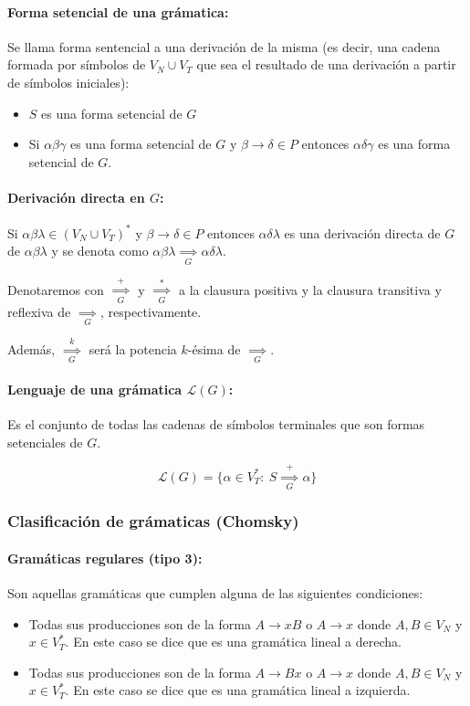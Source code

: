 \paragraph{Forma setencial de una grámatica:} Se llama forma sentencial a una derivación de la misma (es decir, una cadena formada por símbolos de \(V_N\cup V_T\) que sea el resultado de una derivación a partir de símbolos iniciales):
\begin{itemize}
  \item \(S\) es una forma setencial de \(G\)
  \item Si \(\alpha\beta\gamma\) es una forma setencial de \(G\) y \(\beta\to\delta\in P\) entonces \(\alpha\delta\gamma\) es una forma setencial de \(G\).
\end{itemize}

\paragraph{Derivación directa en \(G\):} Si \(\alpha\beta\lambda\in(V_N\cup V_T)^*\) y \(\beta\to\delta\in P\) entonces \(\alpha\delta\lambda\) es una derivación directa de \(G\) de \(\alpha\beta\lambda\) y se denota como \(\alpha\beta\lambda\underset{G}{\implies}\alpha\delta\lambda\).

Denotaremos con \(\overset{+}{\underset{G}{\implies}}\) y \(\overset{*}{\underset{G}{\implies}}\) a la clausura positiva y la clausura transitiva y reflexiva de \(\underset{G}{\implies}\), respectivamente.

Además, \(\overset{k}{\underset{G}{\implies}}\) será la potencia \(k\)-ésima de \(\underset{G}{\implies}\).

\paragraph{Lenguaje de una grámatica \(\mathcal{L}(G)\):} Es el conjunto de todas las cadenas de símbolos terminales que son formas setenciales de \(G\).

\[ \mathcal{L}(G) = \{ \alpha\in V_T^*:~S\overset{+}{\underset{G}{\implies}}\alpha\}\]

\subsubsection{Clasificación de grámaticas (Chomsky)}
\paragraph{Gramáticas regulares (tipo 3):} Son aquellas gramáticas que cumplen alguna de las siguientes condiciones:
\begin{itemize}
  \item Todas sus producciones son de la forma \(A\to xB\) o \(A\to x\) donde \(A,B\in V_N\) y \(x\in V_T^*\). En este caso se dice que es una gramática lineal a derecha.
  \item Todas sus producciones son de la forma \(A\to Bx\) o \(A\to x\) donde \(A,B\in V_N\) y \(x\in V_T^*\). En este caso se dice que es una gramática lineal a izquierda.
\end{itemize}

